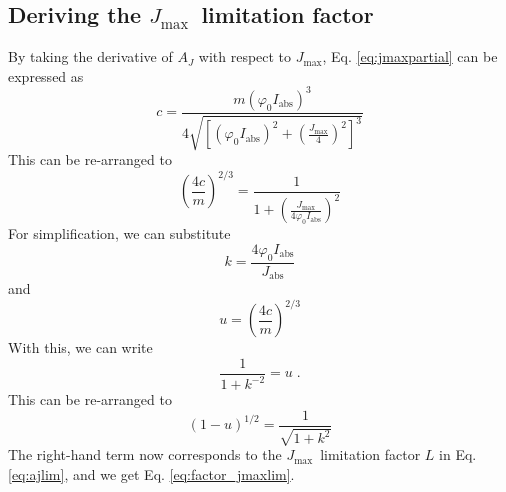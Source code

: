 \documentclass[gmd, manuscript]{copernicus}
\newcommand{\jmax}{$J_{\text{max}}$}
\begin{document}
\subsection{Deriving the \jmax\ limitation factor}
\label{sec:steps_jmaxlim}

By taking the derivative of $A_J$ with respect to \jmax , Eq. \ref{eq:jmaxpartial} can be expressed as
\begin{equation}
    c = \frac{ m (\varphi_0 I_\text{abs})^3}{ 4 \sqrt{ \left[ (\varphi_0 I_\text{abs})^2 + (\frac{J_\text{max}}{4})^2 \right]^3 }}
\end{equation}
This can be re-arranged to
\begin{equation}
    \left(\frac{4c}{m}\right)^{2/3} = \frac{1}{1 + \left( \frac{J_\text{max}}{4\varphi_0 I_\text{abs}}\right)^2}
\end{equation}
For simplification, we can substitute 
\begin{equation}
    k = \frac{4 \varphi_0 I_\text{abs}}{J_\text{abs}}
\end{equation}
and 
\begin{equation}
    u = \left(\frac{4c}{m}\right)^{2/3}
\end{equation}
With this, we can write
\begin{equation}
    \frac{1}{1+k^{-2}} = u \;.
\end{equation}
This can be re-arranged to 
\begin{equation}
    (1-u)^{1/2} = \frac{1}{\sqrt{1+k^2}} 
\end{equation}
The right-hand term now corresponds to the \jmax\ limitation factor $L$ in Eq. \ref{eq:ajlim}, and we get Eq. \ref{eq:factor_jmaxlim}.
\end{document}
